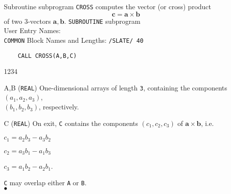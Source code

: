                          
                
                   
Subroutine subprogram {\tt CROSS} computes the vector (or cross) product
$$ \mathbf{c=a \times b}$$
of two 3-vectors $\mathbf{a,b}$.
\Structure
{\tt SUBROUTINE} subprogram  \\
User Entry Names: \\
{\tt COMMON} Block Names and Lengths: {\tt /SLATE/ 40}
\Usage
\begin{verbatim}
    CALL CROSS(A,B,C)
\end{verbatim}
\begin{DLtt}{1234}
\item [A,B] ({\tt REAL}) One-dimensional arrays of length {\tt 3},
containing the components $(a_1,a_2,a_3)$, \\
$(b_1,b_2,b_3)$, respectively.
\item[C] ({\tt REAL}) On exit, {\tt C} contains the components
$(c_1,c_2,c_3)$ of $\mathbf{a \times b}$, i.e.
\item[] $c_1=a_2b_3-a_3b_2$
\item[] $c_2=a_3b_1-a_1b_3$
\item[] $c_3=a_1b_2-a_2b_1$.
\end{DLtt}
{\tt C} may overlap either {\tt A} or {\tt B}.
\\ $\bullet$
